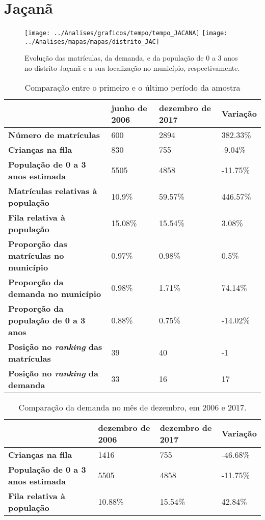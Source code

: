 \section{Jaçanã}
\begin{figure}[H]
	\centering
	\texttt{[image: ../Analises/graficos/tempo/tempo\_JACANA]}
	\texttt{[image: ../Analises/mapas/mapas/distrito\_JAC]}
	\caption{Evolução das matrículas, da demanda, e da população de 0 a 3 anos no distrito Jaçanã e a sua localização no município, respectivamente.}
\end{figure}
\begin{table}[H]
	\begin{tabular}{|l|l|l|l|}
		\hline
		\textbf{}                                      & \textbf{junho de 2006}       & \textbf{dezembro de 2017}    & \textbf{Variação} \\ \hline
		\textbf{Número de matrículas}                  & 600 & 2894 & 382.33\% \\ \hline
		\textbf{Crianças na fila}                      & 830 & 755 & -9.04\% \\ \hline
		\textbf{População de 0 a 3 anos estimada}      & 5505 & 4858 & -11.75\% \\ \hline
		\textbf{Matrículas relativas à população}      & 10.9\% & 59.57\% & 446.57\% \\ \hline
		\textbf{Fila relativa à população}             & 15.08\% & 15.54\% & 3.08\% \\ \hline
		\textbf{Proporção das matrículas no município} & 0.97\% & 0.98\% & 0.5\% \\ \hline
		\textbf{Proporção da demanda no município}     & 0.98\% & 1.71\% & 74.14\% \\ \hline
		\textbf{Proporção da população de 0 a 3 anos}  & 0.88\% & 0.75\% & -14.02\% \\ \hline
		\textbf{Posição no \textit{ranking} das matrículas}     & 39 & 40 & -1 \\ \hline
		\textbf{Posição no \textit{ranking} da demanda}         & 33 & 16 & 17 \\ \hline
	\end{tabular}
	\caption{Comparação entre o primeiro e o último período da amostra}
\end{table}
\begin{table}[H]
	\begin{tabular}{|l|l|l|l|}
		\hline
		\textbf{}                                 & \textbf{dezembro de 2006} & \textbf{dezembro de 2017} & \textbf{Variação} \\ \hline
		\textbf{Crianças na fila}                      & 1416 & 755 & -46.68\% \\ \hline
		\textbf{População de 0 a 3 anos estimada}      & 5505 & 4858 & -11.75\% \\ \hline
		\textbf{Fila relativa à população}             & 10.88\% & 15.54\% & 42.84\% \\ \hline
	\end{tabular}
	\caption{Comparação da demanda no mês de dezembro, em 2006 e 2017.}
\end{table}
